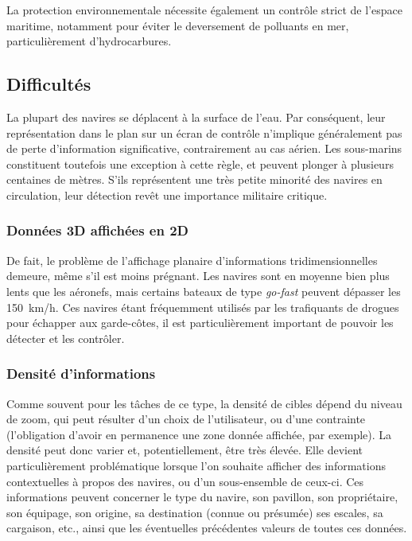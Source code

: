 	La protection environnementale nécessite également un contrôle strict de l'espace maritime, notamment pour éviter le deversement de polluants en mer, particulièrement d'hydrocarbures.
	
	\FloatBarrier \subsection{Difficultés}
	La plupart des navires se déplacent à la surface de l'eau. Par conséquent, leur représentation dans le plan sur un écran de contrôle n'implique généralement pas de perte d'information significative, contrairement au cas aérien. Les sous-marins constituent toutefois une exception à cette règle, et peuvent plonger à plusieurs centaines de mètres. S'ils représentent une très petite minorité des navires en circulation, leur détection revêt une importance militaire critique.
	
	\subsubsection{Données 3D affichées en 2D}
	De fait, le problème de l'affichage planaire d'informations tridimensionnelles demeure, même s'il est moins prégnant. Les navires sont en moyenne bien plus lents que les aéronefs, mais certains bateaux de type \emph{go-fast} peuvent dépasser les 150~km/h. Ces navires étant fréquemment utilisés par les trafiquants de drogues pour échapper aux garde-côtes, il est particulièrement important de pouvoir les détecter et les contrôler.
	
	\subsubsection{Densité d'informations}
	Comme souvent pour les tâches de ce type, la densité de cibles dépend du niveau de zoom, qui peut résulter d'un choix de l'utilisateur, ou d'une contrainte (l'obligation d'avoir en permanence une zone donnée affichée, par exemple). La densité peut donc varier et, potentiellement, être très élevée. Elle devient particulièrement problématique lorsque l'on souhaite afficher des informations contextuelles à propos des navires, ou d'un sous-ensemble de ceux-ci. Ces informations peuvent concerner le type du navire, son pavillon, son propriétaire, son équipage, son origine, sa destination (connue ou présumée) ses escales, sa cargaison, etc., ainsi que les éventuelles précédentes valeurs de toutes ces données.
	
